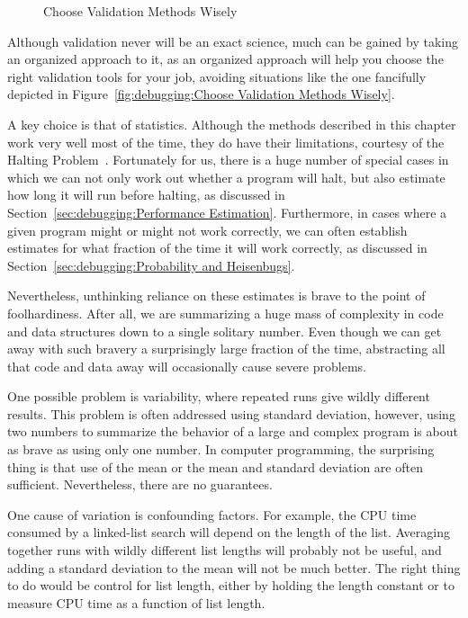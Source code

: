 \begin{figure}[tbp]
\centering
{}
\caption{Choose Validation Methods Wisely}
\end{figure}

Although validation never will be an exact science, much can be gained
by taking an organized approach to it, as an organized approach will
help you choose the right validation tools for your job, avoiding
situations like the one fancifully depicted in
Figure~\ref{fig:debugging:Choose Validation Methods Wisely}.

A key choice is that of statistics.
Although the methods described in this chapter work very well most of
the time, they do have their limitations, courtesy of the Halting
Problem~\cite{AlanMTuring1937HaltingProblem,GeoffreyKPullum2000HaltingProblem}.
Fortunately for us, there is a huge number of special cases in which
we can not only work out whether a program will halt, but also
estimate how long it will run before halting, as discussed in
Section~\ref{sec:debugging:Performance Estimation}.
Furthermore, in cases where a given program might or might not work
correctly, we can often establish estimates for what fraction of the
time it will work correctly, as discussed in
Section~\ref{sec:debugging:Probability and Heisenbugs}.

Nevertheless, unthinking reliance on these estimates is brave to the
point of foolhardiness.
After all, we are summarizing a huge mass of complexity in code and
data structures down to a single solitary number.
Even though we can get away with such bravery a surprisingly large
fraction of the time, abstracting all that code and data away will
occasionally cause severe problems.

One possible problem is variability, where repeated runs give wildly
different results.
This problem is often addressed using standard deviation, however, using
two numbers to summarize the behavior of a large and complex program is
about as brave as using only one number.
In computer programming, the surprising thing is that use of the
mean or the mean and standard deviation are often sufficient.
Nevertheless, there are no guarantees.

One cause of variation is confounding factors.
For example, the CPU time consumed by a linked-list search will depend
on the length of the list.
Averaging together runs with wildly different list lengths will
probably not be useful, and adding a standard deviation to the mean
will not be much better.
The right thing to do would be control for list length, either by
holding the length constant or to measure CPU time as a function of
list length.

